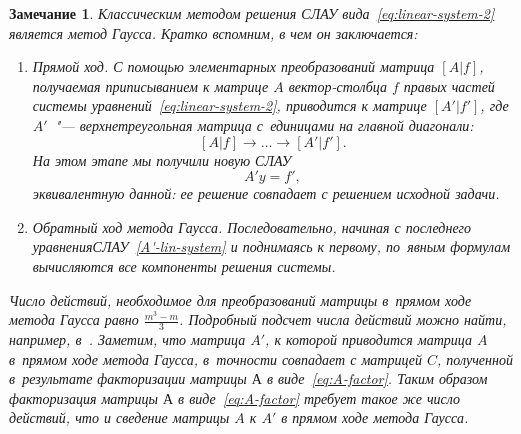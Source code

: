 \documentclass[11pt,a4paper,twoside,listtotoc,bibtotoc]{report}
\numberwithin{equation}{section}
\theoremstyle{definition}
\theoremstyle{plain}
\newtheorem*{note*}{Замечание}
\begin{document}
\begin{note*}
    Классическим методом решения СЛАУ вида~\eqref{eq:linear-system-2}
    является метод Гаусса. Кратко вспомним, в чем он заключается:
    \begin{enumerate}
        \item Прямой ход. С помощью элементарных преобразований матрица $[A|f]$,
        получаемая приписыванием к матрице $A$ вектор-столбца $f$ правых частей
        системы уравнений~\eqref{eq:linear-system-2},
        приводится к матрице $[A'|f']$, где $A'$~"--- верхнетреугольная
        матрица с~единицами на главной диагонали:
        $$
            [A|f] \rightarrow \ldots \rightarrow [A'|f'].
        $$
        На этом этапе мы получили новую СЛАУ
        \begin{equation}
            \label{A'-lin-system}
            A'y=f',
        \end{equation}
        эквивалентную данной: ее решение совпадает с решением исходной задачи.
        \item Обратный ход метода Гаусса. Последовательно, начиная с последнего
        уравнения\linebreak СЛАУ~\eqref{A'-lin-system} и поднимаясь к первому,
        по~явным формулам вычисляются все компоненты решения системы.
    \end{enumerate}
    Число действий, необходимое для преобразований матрицы в~прямом ходе метода Гаусса
    равно $\frac{m^3 - m}{3}$. Подробный подсчет числа действий можно найти,
    например, в~\cite{KostFav}. Заметим, что матрица $A'$, к которой приводится матрица $A$
    в~прямом ходе метода Гаусса, в~точности совпадает с матрицей $C$, полученной
    в~результате факторизации матрицы $А$ в виде~\eqref{eq:A-factor}.
    Таким образом факторизация матрицы $А$ в виде~\eqref{eq:A-factor}
    требует такое же число действий, что и сведение матрицы $A$ к $A'$ в прямом ходе
    метода Гаусса.
\end{note*}
%
\end{document}
